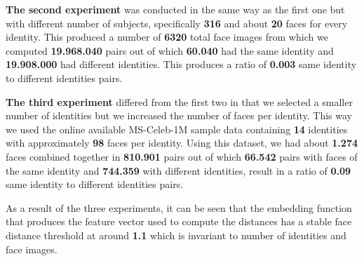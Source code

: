 \textbf{The second experiment} was conducted in the same way as the first one but with different number of subjects, specifically \textbf{316} and about \textbf{20} faces for every identity. This produced a number of \textbf{6320} total face images from which we computed \textbf{19.968.040} pairs out of which \textbf{60.040} had the same identity and \textbf{19.908.000} had different identities. This produces a ratio of \textbf{0.003} same identity to different identities pairs.

\textbf{The third experiment} differed from the first two in that we selected a smaller number of identities but we increased the number of faces per identity. This way we used the online available MS-Celeb-1M sample data containing \textbf{14} identities with approximately \textbf{98} faces per identity. Using this dataset, we had about \textbf{1.274} faces combined together in \textbf{810.901} pairs out of which \textbf{66.542} pairs with faces of the same identity and \textbf{744.359} with different identities, result in a ratio of \textbf{0.09} 	same identity to different identities pairs.

As a result of the three experiments, it can be seen that the embedding function that produces the feature vector used to compute the distances has a stable face distance threshold at around \textbf{1.1} which is invariant to number of identities and face images.